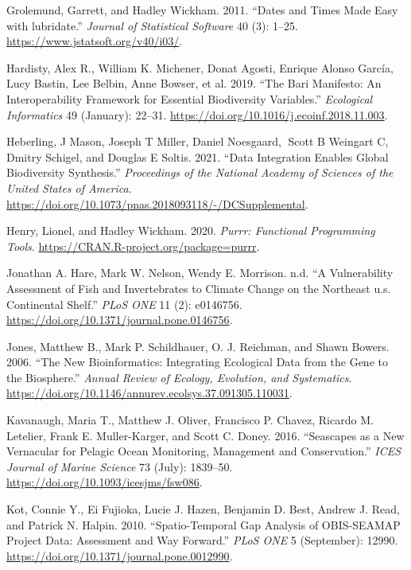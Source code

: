 \documentclass[
]{book}
\newlength{\cslhangindent}
\newlength{\cslentryspacingunit} %
\newenvironment{CSLReferences}[2] %
 {%
  \setlength{\parindent}{0pt}
  \ifodd #1
  \let\oldpar\par
  \def\par{\hangindent=\cslhangindent\oldpar}
  \fi
  \setlength{\parskip}{#2\cslentryspacingunit}
 }%
 {}
\begin{document}
\begin{CSLReferences}{1}{0}
\leavevmode{}%
Grolemund, Garrett, and Hadley Wickham. 2011. {``Dates and Times Made Easy with {lubridate}.''} \emph{Journal of Statistical Software} 40 (3): 1--25. \url{https://www.jstatsoft.org/v40/i03/}.

\leavevmode{}%
Hardisty, Alex R., William K. Michener, Donat Agosti, Enrique Alonso García, Lucy Bastin, Lee Belbin, Anne Bowser, et al. 2019. {``The Bari Manifesto: An Interoperability Framework for Essential Biodiversity Variables.''} \emph{Ecological Informatics} 49 (January): 22--31. \url{https://doi.org/10.1016/j.ecoinf.2018.11.003}.

\leavevmode{}%
Heberling, J Mason, Joseph T Miller, Daniel Noesgaard, Scott B Weingart C, Dmitry Schigel, and Douglas E Soltis. 2021. {``Data Integration Enables Global Biodiversity Synthesis.''} \emph{Proceedings of the National Academy of Sciences of the United States of America}. \url{https://doi.org/10.1073/pnas.2018093118/-/DCSupplemental}.

\leavevmode{}%
Henry, Lionel, and Hadley Wickham. 2020. \emph{Purrr: Functional Programming Tools}. \url{https://CRAN.R-project.org/package=purrr}.

\leavevmode{}%
Jonathan A. Hare, Mark W. Nelson, Wendy E. Morrison. n.d. {``A Vulnerability Assessment of Fish and Invertebrates to Climate Change on the Northeast u.s. Continental Shelf.''} \emph{PLoS ONE} 11 (2): e0146756. \url{https://doi.org/10.1371/journal.pone.0146756}.

\leavevmode{}%
Jones, Matthew B., Mark P. Schildhauer, O. J. Reichman, and Shawn Bowers. 2006. {``The New Bioinformatics: Integrating Ecological Data from the Gene to the Biosphere.''} \emph{Annual Review of Ecology, Evolution, and Systematics}. \url{https://doi.org/10.1146/annurev.ecolsys.37.091305.110031}.

\leavevmode{}%
Kavanaugh, Maria T., Matthew J. Oliver, Francisco P. Chavez, Ricardo M. Letelier, Frank E. Muller-Karger, and Scott C. Doney. 2016. {``Seascapes as a New Vernacular for Pelagic Ocean Monitoring, Management and Conservation.''} \emph{ICES Journal of Marine Science} 73 (July): 1839--50. \url{https://doi.org/10.1093/icesjms/fsw086}.

\leavevmode{}%
Kot, Connie Y., Ei Fujioka, Lucie J. Hazen, Benjamin D. Best, Andrew J. Read, and Patrick N. Halpin. 2010. {``Spatio-Temporal Gap Analysis of OBIS-SEAMAP Project Data: Assessment and Way Forward.''} \emph{PLoS ONE} 5 (September): 12990. \url{https://doi.org/10.1371/journal.pone.0012990}.


\end{CSLReferences}
\end{document}
